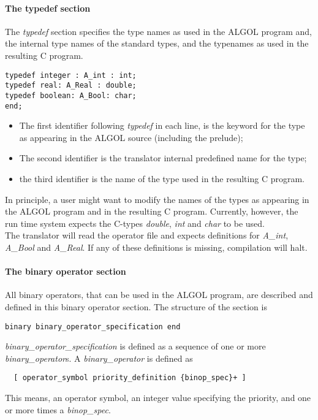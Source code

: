 \documentclass[11pt]{article}
\begin{document}
\paragraph{The typedef section}
The {\em typedef} section specifies the type names as used in the ALGOL program and,
the internal type names of the standard types, and the
typenames as used in the resulting C program.

{\footnotesize
\begin{verbatim}
typedef integer : A_int : int;
typedef real: A_Real : double;
typedef boolean: A_Bool: char;
end;
\end{verbatim}
}

\begin{itemize}
\item The first identifier following {\em typedef} in each line,
is the keyword for the type as appearing in the ALGOL source (including the
prelude);
\item The second identifier is the translator internal predefined
name for the type;
\item the third identifier is the name of the type used in the resulting C program. 
\end{itemize}
In principle, a user might want to modify the names of the
types as appearing in the ALGOL program and in the resulting C program.
Currently, however, the run time system expects the C-types 
{\em double}, {\em int} and {\em char} to be used.
\ \\
The translator will read the operator file and
expects definitions for {\em A\_int},
{\em A\_Bool} and {\em A\_Real}.
If any of these definitions is missing, compilation will halt.

\paragraph{The binary operator section}
All binary operators, 
that can be used in the ALGOL program, are
described and defined in this binary operator section.
The structure of the section is
{\footnotesize
\begin{verbatim}
binary binary_operator_specification end
\end{verbatim}
}
{\em binary\_operator\_specification} is defined as a sequence
of one or more {\em binary\_operator}s.
A {\em binary\_operator} is defined as
{\footnotesize
\begin{verbatim}
  [ operator_symbol priority_definition {binop_spec}+ ]
\end{verbatim}
}
This means, an operator symbol, an integer value specifying the priority,
and one or more times a {\em binop\_spec}.
\end{document}
